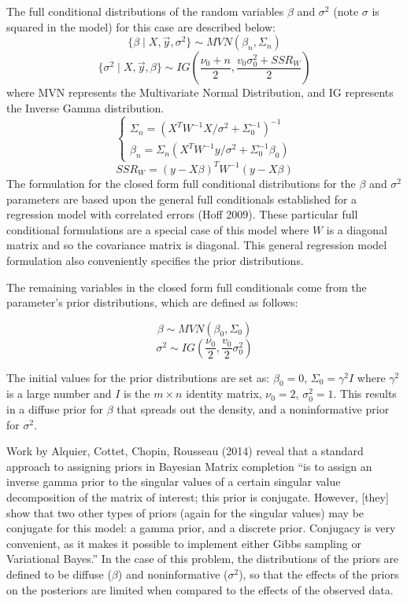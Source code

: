 \documentclass[12pt,twoside]{dukestatscithesis}
\theoremstyle{definition}
\theoremstyle{definition}
\theoremstyle{definition}
\theoremstyle{remark}
\begin{document}
The full conditional distributions of the random variables \(\beta\) and
\(\sigma^2\) (note \(\sigma\) is squared in the model) for this case are
described below:
\[\{\beta \mid X, \vec{y}, \sigma^2\} \sim MVN (\beta_n, \Sigma_n)\]
\[\{\sigma^2 \mid X, \vec{y}, \beta\} \sim IG (\frac{\nu_0 + n}{2}, \frac{v_0\sigma^2_0 + SSR_W}{2})\]
where MVN represents the Multivariate Normal Distribution, and IG
represents the Inverse Gamma distribution. \[ \begin{cases}
      \Sigma_n = (X^TW^{-1}X/\sigma^2+\Sigma_0^{-1})^{-1}\\
      \beta_n = \Sigma_n(X^TW^{-1}y/\sigma^2 + \Sigma_0^{-1} \beta_0)
    \end{cases}\] \[SSR_W = (y - X\beta)^TW^{-1}(y-X\beta)\]
The formulation for the closed form full conditional distributions for
the \(\beta\) and \(\sigma^2\) parameters are based upon the general
full conditionals established for a regression model with correlated
errors (Hoff 2009). These particular full conditional formulations are a
special case of this model where \(W\) is a diagonal matrix and so the
covariance matrix is diagonal. This general regression model formulation
also conveniently specifies the prior distributions.

The remaining variables in the closed form full conditionals come from
the parameter's prior distributions, which are defined as follows:

\[\beta \sim MVN (\beta_0, \Sigma_0)\]
\[\sigma^2 \sim IG (\frac{\nu_0}{2}, \frac{v_0}{2}\sigma_0^2)\]

The initial values for the prior distributions are set as:
\(\beta_0 = 0\), \(\Sigma_0 = \gamma^2I\) where \(\gamma^2\) is a large
number and \(I\) is the \(m \times n\) identity matrix, \(\nu_0 = 2\),
\(\sigma_0^2 = 1\). This results in a diffuse prior for \(\beta\) that
spreads out the density, and a noninformative prior for \(\sigma^2\).

Work by Alquier, Cottet, Chopin, Rousseau (2014) reveal that a standard
approach to assigning priors in Bayesian Matrix completion ``is to
assign an inverse gamma prior to the singular values of a certain
singular value decomposition of the matrix of interest; this prior is
conjugate. However, {[}they{]} show that two other types of priors
(again for the singular values) may be conjugate for this model: a gamma
prior, and a discrete prior. Conjugacy is very convenient, as it makes
it possible to implement either Gibbs sampling or Variational Bayes.''
In the case of this problem, the distributions of the priors are defined
to be diffuse (\(\beta\)) and noninformative (\(\sigma^2\)), so that the
effects of the priors on the posteriors are limited when compared to the
effects of the observed data.
\end{document}
